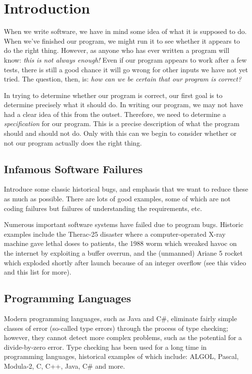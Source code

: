 \chapter{Introduction}
When we write software, we have in mind some idea of what it is supposed to do.  When we've finished our program, we might run it to see whether it appears to do the right thing.  However, as anyone who has ever written a program will know: {\em this is not always enough!}  Even if our program appears to work after a few tests, there is still a good chance it will go wrong for other inputs we have not yet tried.  The question, then, is: {\em how can we be certain that our program is correct?}

In trying to determine whether our program is correct, our first goal is to determine precisely what it should do.  In writing our program, we may not have had a clear idea of this from the outset.  Therefore, we need to determine a {\em specification} for our program.  This is a precise description of what the program should and should not do.  Only with this can we begin to consider whether or not our program actually does the right thing.


\section{Infamous Software Failures}

Introduce some classic historical bugs, and emphasis that we want to
reduce these as much as possible.  There are lots of good examples,
some of which are not coding failures but failures of understanding
the requirements, etc.

Numerous important software systems have failed due to program bugs. Historic examples include the Therac-25 disaster where a computer-operated X-ray machine gave lethal doses to patients, the 1988 worm which wreaked havoc on the internet by exploiting a buffer overrun, and the (unmanned) Ariane 5 rocket which exploded shortly after launch because of an integer overflow (see this video and this list for more).

\section{Programming Languages}

Modern programming languages, such as Java and C\#, eliminate fairly simple classes of error (so-called type errors) through the process of type checking; however, they cannot detect more complex problems, such as the potential for a divide-by-zero error. Type checking has been used for a long time in programming languages, historical examples of which include: ALGOL, Pascal, Modula-2, C, C++, Java, C\# and more.

